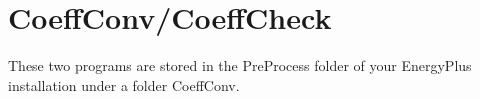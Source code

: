 \chapter{CoeffConv/CoeffCheck}\label{coeffconvcoeffcheck}

These two programs are stored in the PreProcess folder of your EnergyPlus installation under a folder CoeffConv.
